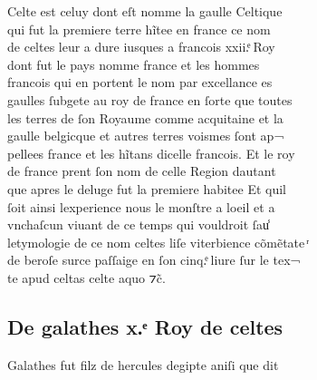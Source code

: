 \documentclass[12pt]{article}
\begin{document}
Celte est celuy dont eſt nomme la gaulle
            Celtique\\
qui fut la premiere terre hĩtee en france ce nom\\
de celtes
          leur a dure iusques a francois xxii.ͤ Roy\\
dont fut le pays nomme france et les
            hommes\\
francois qui en portent le nom par excellance es\\
gaulles
          ſubgete au roy de france en ſorte que toutes\\
les terres de ſon Royaume comme
          acquitaine et la\\
gaulle belgicque et autres terres voismes ſont ap¬\\
pellees france et les hĩtans dicelle francois. Et le roy\\
de france prent ſon
          nom de celle Region dautant\\
que apres le deluge fut la premiere habitee Et
            quil\\
ſoit ainsi lexperience nous le monſtre a loeil et a\\
vnchaſcun
          viuant de ce temps qui vouldroit ſau̾\\
letymologie de ce nom celtes liſe
          viterbience cõmẽtate ͬ\\
de beroſe surce
          paſſaige en ſon cinq.ͤ liure ſur le tex¬\\
te apud celtas celte aquo ⁊c̃.





\subsection*{De galathes x.ͤ Roy de celtes}


Galathes fut filz de hercules degipte aniſi que
          dit
\end{document}
